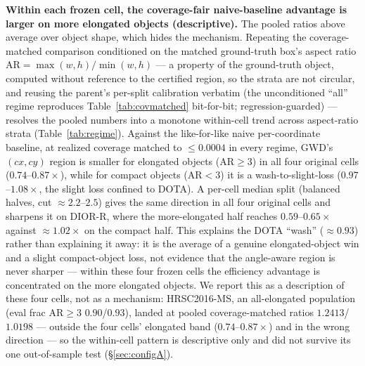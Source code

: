 \documentclass[journal]{IEEEtran}
\begin{document}
\textbf{Within each frozen cell, the coverage-fair naive-baseline advantage is larger on more elongated objects (descriptive).}
The pooled ratios above average over object shape, which hides the mechanism. Repeating the
coverage-matched comparison conditioned on the matched ground-truth box's aspect ratio
$\mathrm{AR}=\max(w,h)/\min(w,h)$ --- a property of the ground-truth object, computed without
reference to the certified region, so the strata are not circular, and reusing the parent's per-split
calibration verbatim (the unconditioned ``all'' regime reproduces Table~\ref{tab:covmatched}
bit-for-bit; regression-guarded) --- resolves the pooled numbers into a monotone within-cell trend across
aspect-ratio strata (Table~\ref{tab:regime}). Against the like-for-like naive per-coordinate baseline, at realized coverage
matched to $\le 0.0004$ in every regime, GWD's $(cx,cy)$ region is smaller for elongated
objects ($\mathrm{AR}\ge3$) in all four original cells ($0.74$--$0.87\times$), while for compact
objects ($\mathrm{AR}<3$) it is a wash-to-slight-loss ($0.97$--$1.08\times$, the slight loss confined to
DOTA). A per-cell median split (balanced halves, cut $\approx2.2$--$2.5$) gives the same direction in all
four original cells and sharpens it on DIOR-R, where the more-elongated half reaches $0.59$--$0.65\times$ against
$\approx1.02\times$ on the compact half. This explains the DOTA ``wash'' ($\approx0.93$) rather
than explaining it away: it is the average of a genuine elongated-object win and a slight compact-object
loss, not evidence that the angle-aware region is never sharper --- within these four frozen cells the
efficiency advantage is concentrated on the more elongated objects. We report this as a description of these
four cells, not as a mechanism: HRSC2016-MS, an all-elongated population (eval frac $\mathrm{AR}\ge3$
$0.90$/$0.93$), landed at pooled coverage-matched ratios $1.2413$/$1.0198$ --- outside the four cells'
elongated band ($0.74$--$0.87\times$) and in the wrong direction --- so the within-cell pattern is descriptive
only and did not survive its one out-of-sample test (\S\ref{sec:configA}).
\end{document}
